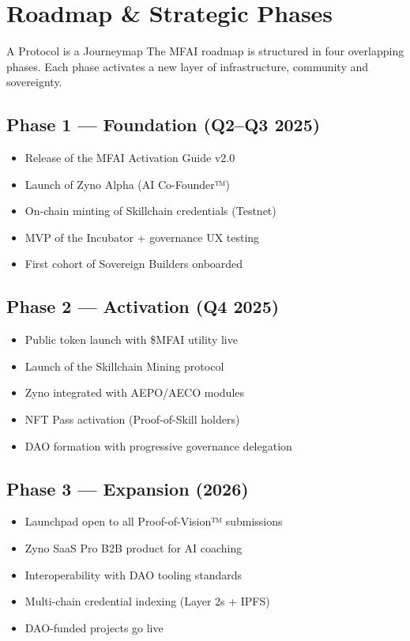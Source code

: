 \section{Roadmap \& Strategic Phases}

\begin{mfai-box}{A Protocol is a Journey}{map}
The MFAI roadmap is structured in four overlapping phases. Each phase activates a new layer of infrastructure, community and sovereignty.
\end{mfai-box}

\vspace{1.5em}

\subsection*{Phase 1 — Foundation (Q2–Q3 2025)}
\begin{itemize}
  \item Release of the MFAI Activation Guide v2.0
  \item Launch of Zyno Alpha (AI Co-Founder™)
  \item On-chain minting of Skillchain credentials (Testnet)
  \item MVP of the Incubator + governance UX testing
  \item First cohort of Sovereign Builders onboarded
\end{itemize}

\subsection*{Phase 2 — Activation (Q4 2025)}
\begin{itemize}
  \item Public token launch with \$MFAI utility live
  \item Launch of the Skillchain Mining protocol
  \item Zyno integrated with AEPO/AECO modules
  \item NFT Pass activation (Proof-of-Skill holders)
  \item DAO formation with progressive governance delegation
\end{itemize}

\subsection*{Phase 3 — Expansion (2026)}
\begin{itemize}
  \item Launchpad open to all Proof-of-Vision™ submissions
  \item Zyno SaaS Pro B2B product for AI coaching
  \item Interoperability with DAO tooling standards
  \item Multi-chain credential indexing (Layer 2s + IPFS)
  \item DAO-funded projects go live
\end{itemize}

